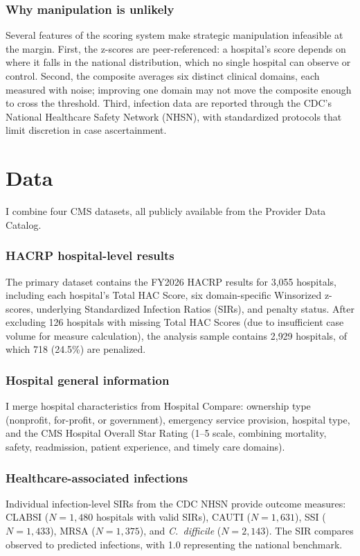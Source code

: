 \documentclass[12pt]{article}
\begin{document}
\subsubsection*{Why manipulation is unlikely} Several features of the scoring system make strategic manipulation infeasible at the margin. First, the z-scores are peer-referenced: a hospital's score depends on where it falls in the national distribution, which no single hospital can observe or control. Second, the composite averages six distinct clinical domains, each measured with noise; improving one domain may not move the composite enough to cross the threshold. Third, infection data are reported through the CDC's National Healthcare Safety Network (NHSN), with standardized protocols that limit discretion in case ascertainment.


\section{Data}\label{sec:data}

I combine four CMS datasets, all publicly available from the Provider Data Catalog.

\subsubsection*{HACRP hospital-level results} The primary dataset contains the FY2026 HACRP results for 3{,}055 hospitals, including each hospital's Total HAC Score, six domain-specific Winsorized z-scores, underlying Standardized Infection Ratios (SIRs), and penalty status. After excluding 126 hospitals with missing Total HAC Scores (due to insufficient case volume for measure calculation), the analysis sample contains 2{,}929 hospitals, of which 718 (24.5\%) are penalized.

\subsubsection*{Hospital general information} I merge hospital characteristics from Hospital Compare: ownership type (nonprofit, for-profit, or government), emergency service provision, hospital type, and the CMS Hospital Overall Star Rating (1--5 scale, combining mortality, safety, readmission, patient experience, and timely care domains).

\subsubsection*{Healthcare-associated infections} Individual infection-level SIRs from the CDC NHSN provide outcome measures: CLABSI ($N = 1{,}480$ hospitals with valid SIRs), CAUTI ($N = 1{,}631$), SSI ($N = 1{,}433$), MRSA ($N = 1{,}375$), and \textit{C.\ difficile} ($N = 2{,}143$). The SIR compares observed to predicted infections, with 1.0 representing the national benchmark.
\end{document}
